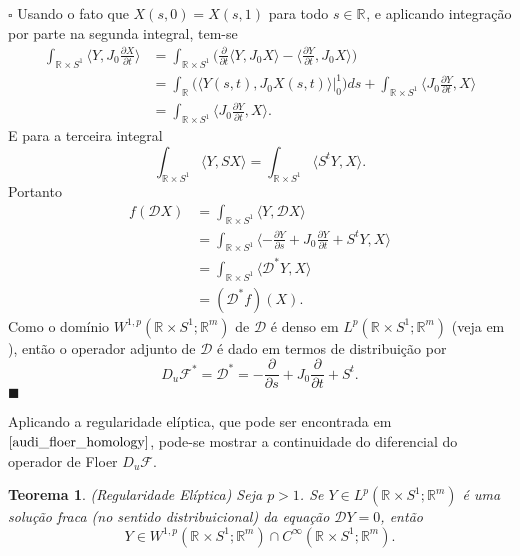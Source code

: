 \documentclass[12pt]{book}
\newtheorem{teorema}{Teorema}[section]
\newenvironment{prova}[1]{$\square$ #1}{\hfill$\blacksquare$}
\newcommand{\bigparenteses}[1]{\Big( #1 \Big) }
\newcommand{\circulo}{S^{1}}
\newcommand{\diferencialfloerponto}[1]{D_{#1}\operadorFloer}
\newcommand{\diferencialfloeradjponto}[1]{D_{#1}\operadorFloer^{*}}
\newcommand{\diferencialfloerabrev}{\mathcal{D}}
\newcommand{\derivadaparcial}[2]{\frac{\partial #1}{\partial #2}}
\newcommand{\espacoLpcontradominio}[2]{L^{p}(#1;#2)}
\newcommand{\espacosobolevcontradominio}[2]{W^{1,p}(#1;#2)}
\newcommand{\estruturacomplexa}{J_{0}}
\newcommand{\operadorFloer}{\mathcal{F}}
\newcommand{\produtointerno}[2]{\langle #1, #2 \rangle}
\newcommand{\retacartesianocirculo}{\real{} \times \circulo}
\newcommand{\real}[1]{\mathbb{R}^{#1}}
\newcommand{\reta}{\real{}}
\begin{document}
\begin{prova}
		Usando o fato que $X(s, 0)=X(s, 1)$ para todo $s\in \reta$, e aplicando integração por parte na segunda integral, tem-se
		$$
		\begin{aligned}
		\int_{\retacartesianocirculo}\produtointerno{Y}{\estruturacomplexa\derivadaparcial{ X}{t}} 
		&= \int_{\retacartesianocirculo}\bigparenteses{\derivadaparcial{}{t}\produtointerno{Y}{ \estruturacomplexa X}-\produtointerno{\derivadaparcial{Y}{t} }{\estruturacomplexa X}}
		\\
		&= \int_{\reta}\bigparenteses{\produtointerno{Y(s,t)}{\estruturacomplexa X(s,t)}\Big|_{0}^{1}}ds + \int_{\retacartesianocirculo}\produtointerno{\estruturacomplexa \derivadaparcial{Y}{t}}{ X}
		\\
		&=\int_{\retacartesianocirculo}\produtointerno{\estruturacomplexa \derivadaparcial{Y}{t}}{ X}.
		\end{aligned}
		$$
		E para a terceira integral
		$$
		\int_{\retacartesianocirculo}\produtointerno{Y}{S X}= \int_{\retacartesianocirculo}\produtointerno{S^{t}Y}{ X}.
		$$
		Portanto
		$$
		\begin{aligned}
		f(\diferencialfloerabrev X)
		&= \int_{\retacartesianocirculo}\produtointerno{Y}{\diferencialfloerabrev X}
		\\
		&=
		\int_{\retacartesianocirculo}\produtointerno{-\derivadaparcial{Y}{s}+\estruturacomplexa \derivadaparcial{Y}{t} + S^{t}Y}{ X}
		\\
		&=\int_{\retacartesianocirculo}\produtointerno{\diferencialfloerabrev^{*}Y}{ X}
		\\
		&=(\diferencialfloerabrev^{*}f)(X).
		\end{aligned}
		$$
		Como o domínio $\espacosobolevcontradominio{\retacartesianocirculo}{\real{m}} $ de $\diferencialfloerabrev$ é denso em $\espacoLpcontradominio{\retacartesianocirculo}{\real{m}}$ (veja em \cite{breazis_sobolev_spaces}), então o operador adjunto de $\diferencialfloerabrev$ é dado em termos de distribuição por
		$$
		\diferencialfloeradjponto{u}=\diferencialfloerabrev^{*}=-\derivadaparcial{}{s}+\estruturacomplexa \derivadaparcial{}{t}+S^{t}.
		$$
	\end{prova}
	
	Aplicando a regularidade elíptica, que pode ser encontrada em $\cite{audi_floer_homology}$, pode-se mostrar a continuidade do diferencial do operador de Floer $\diferencialfloerponto{u}$.
	
	\begin{teorema}\label{teorema_regularidade_eliptica}
		(Regularidade Elíptica) Seja $p> 1$. Se $Y \in \espacoLpcontradominio{\retacartesianocirculo}{\real{m}}$ é uma solução fraca (no sentido distribuicional) da equação $\diferencialfloerabrev Y =0$, então 
		$$
		Y \in \espacosobolevcontradominio{\retacartesianocirculo}{\real{m}} \cap C^{\infty}(\retacartesianocirculo;\real{m}).$$
	\end{teorema} 
	
\end{document}
